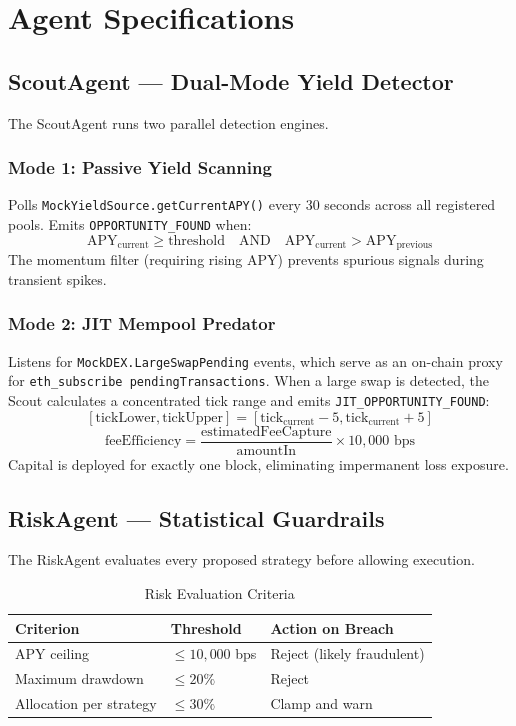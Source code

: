 \documentclass[11pt,a4paper]{article}
\begin{document}
\section{Agent Specifications}

\subsection{ScoutAgent --- Dual-Mode Yield Detector}

The ScoutAgent runs two parallel detection engines.

\subsubsection{Mode 1: Passive Yield Scanning}
Polls \texttt{MockYieldSource.getCurrentAPY()} every 30 seconds across all registered pools.
Emits \texttt{OPPORTUNITY\_FOUND} when:
\[
  \text{APY}_{\text{current}} \geq \text{threshold} \quad \text{AND} \quad
  \text{APY}_{\text{current}} > \text{APY}_{\text{previous}}
\]
The momentum filter (requiring rising APY) prevents spurious signals during transient spikes.

\subsubsection{Mode 2: JIT Mempool Predator}
Listens for \texttt{MockDEX.LargeSwapPending} events, which serve as an on-chain proxy for
\texttt{eth\_subscribe pendingTransactions}. When a large swap is detected, the Scout
calculates a concentrated tick range and emits \texttt{JIT\_OPPORTUNITY\_FOUND}:
\[
  [\text{tickLower}, \text{tickUpper}] = [\text{tick}_{\text{current}} - 5, \text{tick}_{\text{current}} + 5]
\]
\[
  \text{feeEfficiency} = \frac{\text{estimatedFeeCapture}}{\text{amountIn}} \times 10{,}000 \text{ bps}
\]
Capital is deployed for exactly one block, eliminating impermanent loss exposure.

\subsection{RiskAgent --- Statistical Guardrails}

The RiskAgent evaluates every proposed strategy before allowing execution.

\begin{table}[H]
\centering
\caption{Risk Evaluation Criteria}
\begin{tabular}{@{}lll@{}}
  \toprule
  \textbf{Criterion}  & \textbf{Threshold}      & \textbf{Action on Breach} \\
  \midrule
  APY ceiling         & $\leq 10{,}000$ bps     & Reject (likely fraudulent) \\
  Maximum drawdown    & $\leq 20\%$             & Reject \\
  Allocation per strategy & $\leq 30\%$         & Clamp and warn \\
  \bottomrule
\end{tabular}
\end{table}
\end{document}
